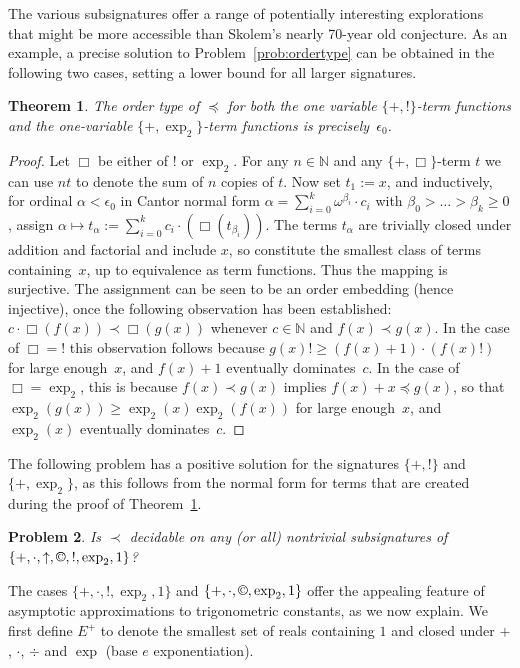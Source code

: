\documentclass[eqnor,reqno]{amsart}
\theoremstyle{plain}
\newtheorem{thm}{Theorem}[section]
\newtheorem{problem}[thm]{Problem}
\theoremstyle{definition}
\newcommand{\cc}{\mathbin{\textup{\copyright}}}
\newcommand{\up}[1]{\textup{#1}}
\begin{document}
The various subsignatures offer a range of potentially interesting explorations that might be more accessible than Skolem's nearly 70-year old conjecture.  As an example, a precise solution to Problem~\ref{prob:ordertype} can be obtained in the following two cases, setting a lower bound for all larger signatures.
\begin{thm}\label{thm:prec}
The order type of $\preceq$ for both the one variable $\{+,!\}$-term functions and the one-variable $\{+,\exp_2\}$-term functions is precisely~$\epsilon_0$.
\end{thm}
\begin{proof}
Let $\Box$ be either of $!$ or $\exp_2$.  
For any $n\in \mathbb{N}$ and any $\{+,\Box\}$-term $t$ we can use $nt$ to denote the sum of $n$ copies of $t$.  
Now set $t_1:=x$, and inductively, for ordinal $\alpha<\epsilon_0$ in Cantor normal form $\alpha=\sum_{i=0}^k\omega^{\beta_i}\cdot c_i$ with $\beta_0>\dots> \beta_k\geq 0$, assign $\alpha\mapsto t_\alpha:=\sum_{i=0}^kc_i \cdot (\Box(t_{\beta_i}))$.  
The terms $t_\alpha$ are trivially closed under addition and factorial and include $x$, so constitute the smallest class of terms containing~$x$, up to equivalence as term functions.  
Thus the mapping is surjective.   
The assignment can be seen to be an order embedding (hence injective), once the following observation has been established:  $c\cdot  \Box(f(x))\prec \Box(g(x))$ whenever $c\in\mathbb{N}$ and $f(x)\prec g(x)$. 
In the case of $\Box={!}$ this observation follows because $g(x)!\geq (f(x)+1)\cdot (f(x)!)$ for large enough~$x$, and $f(x)+1$ eventually dominates~$c$.  
In the case of $\Box = {\exp_2}$, this is because $f(x)\prec g(x)$ implies $f(x)+x\preceq g(x)$, so that $\exp_2(g(x))\geq \exp_2(x)\exp_2(f(x))$ for large enough~$x$, and $\exp_2(x)$ eventually dominates~$c$.
\end{proof}
The following problem has a positive solution for the signatures $\{+,!\}$ and $\{+,\exp_2\}$, as this follows from the normal form for terms that are created during the proof of Theorem~\ref{thm:prec}.
\begin{problem}\label{prob:precdec}
Is $\prec$ decidable on any \up(or all\up) nontrivial subsignatures of $\{+,\cdot,\uparrow,\cc,!,\exp_2,1\}$?
\end{problem}
The cases $\{+,\cdot,!,\exp_2,1\}$ and $\{+,\cdot,\cc,\exp_2,1\}$ offer the appealing feature of asymptotic approximations to trigonometric constants, as we now explain.  
We first define $E^+$ to denote the smallest set of reals containing $1$ and closed under $+$, $\cdot$, $\div$ and $\exp$ (base $e$ exponentiation).  
\end{document}
